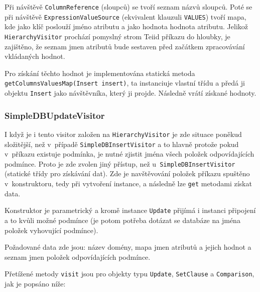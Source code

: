 \documentclass[oneside,12pt]{fithesis2}
\begin{document}
Při návštěvě \texttt{ColumnReference} (sloupců) se tvoří seznam názvů sloupců. Poté se při návštěvě \texttt{ExpressionValueSource} (ekvivalent klauzuli \texttt{VALUES}) tvoří mapa, kde jako klíč poslouží jméno atributu a jako hodnota hodnota atributu. Jelikož \texttt{HierarchyVisitor} prochází pomyslný strom Teiid příkazu do hloubky, je zajištěno, že seznam jmen atributů bude sestaven před začátkem zpracovávání vkládaných hodnot.

Pro získání těchto hodnot je implementována statická metoda \texttt{get\allowbreak Columns\allowbreak ValuesMap(Insert insert)}, ta instanciuje vlastní třídu a předá ji objektu \texttt{Insert} jako návštěvníka, který ji projde. Následně vrátí získané hodnoty.

\subsubsection*{SimpleDBUpdateVisitor}
I když je i tento visitor založen na \texttt{HierarchyVisitor} je zde situace poněkud složitější, než v~případě \texttt{SimpleDBInsertVisitor} a to hlavně protože pokud v~příkazu existuje podmínka, je nutné zjistit jména všech položek odpovídajících podmínce. Proto je zde zvolen jiný přístup, než u~\texttt{SimpleDBInsertVisitor} (statické třídy pro získávání dat). Zde je navštěvování položek příkazu spuštěno v~konstruktoru, tedy při vytvoření instance, a následně lze \texttt{get} metodami získat  data.

Konstruktor je parametrický a kromě instance \texttt{Update} přijímá i instanci připojení a to kvůli možné podmínce (je potom potřeba dotázat se databáze na jména položek vyhovující podmínce).

Požadované data zde jsou: název domény, mapa jmen atributů a jejich hodnot a seznam jmen položek odpovídajících podmínce.

Přetížené metody \texttt{visit} jsou pro objekty typu \texttt{Update}, \texttt{SetClause} a \texttt{Comparison}, jak je popsáno níže:
\end{document}
